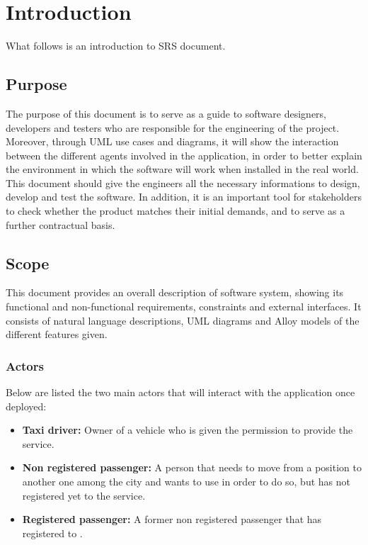 \section{Introduction}      %
What follows is an introduction to \myTaxiService{} SRS document.
\subsection{Purpose}
The purpose of this document is to serve as a guide to software designers, developers and testers who are responsible for the engineering of the \myTaxiService{} project.
Moreover, through UML use cases and diagrams, it will show the interaction between the different agents involved in the application, in order to better explain the environment in which the software will work when installed in the real world.
This document should give the engineers all the necessary informations to design, develop and test the software.
In addition, it is an important tool for stakeholders to check whether the product matches their initial demands, and to serve as a further contractual basis.
\subsection{Scope}
This document provides an overall description of \myTaxiService{} software system, showing its functional and non-functional requirements, constraints and external interfaces.
It consists of natural language descriptions, UML diagrams and Alloy models of the different features given.
\subsubsection{Actors}
Below are listed the two main actors that will interact with the application once deployed:
\begin{itemize}
	\item\textbf{Taxi driver:}	Owner of a vehicle who is given the permission to provide the service.
	\item\textbf{Non registered passenger:} A person that needs to move from a position to another one among the city and wants to use \myTaxiService{} in order to do so, but has not registered yet to the service.
	\item\textbf{Registered passenger:} A former non registered passenger that has registered to \myTaxiService{}.
\end{itemize}
